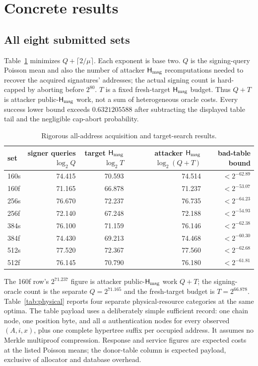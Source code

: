 \documentclass[11pt,a4paper]{article}
\newcommand{\Hmsg}{\ensuremath{\mathsf{H}_{\rm msg}}}
\begin{document}
\section{Concrete results}

\subsection{All eight submitted sets}

Table~\ref{tab:formal} minimizes $Q+\lceil2/\mu\rceil$.  Each exponent is base
two.  $Q$ is the signing-query Poisson mean and also the number of attacker
$\Hmsg$ recomputations needed to recover the acquired signatures' addresses;
the actual signing count is hard-capped by aborting before $2^{80}$.  $T$ is a
fixed fresh-target $\Hmsg$ budget.  Thus $Q+T$ is attacker public-$\Hmsg$ work,
not a sum of heterogeneous oracle costs.  Every success lower bound exceeds
$0.6321205588$ after subtracting the displayed table tail and the negligible
cap-abort probability.

\begin{table}[ht]
\centering
\small
\caption{Rigorous all-address acquisition and target-search results.}
\label{tab:formal}
\begin{tabular}{lrrrr}
\toprule
set & signer queries $\log_2 Q$ & target $\Hmsg$ $\log_2 T$ &
attacker $\Hmsg$ $\log_2(Q+T)$ & bad-table bound\\
\midrule
160s &74.415&70.593&74.514&$<2^{-62.89}$\\
160f &71.165&66.878&71.237&$<2^{-53.07}$\\
256s &76.670&72.237&76.735&$<2^{-64.23}$\\
256f &72.140&67.248&72.188&$<2^{-54.93}$\\
384s &76.100&71.159&76.146&$<2^{-62.38}$\\
384f &74.430&69.213&74.468&$<2^{-60.30}$\\
512s &77.520&72.367&77.560&$<2^{-62.68}$\\
512f &76.145&70.790&76.180&$<2^{-61.81}$\\
\bottomrule
\end{tabular}
\end{table}

The 160f row's $2^{71.237}$ figure is attacker public-$\Hmsg$ work $Q+T$;
the signing-oracle count is the separate $Q=2^{71.165}$ and the fresh-target
budget is $T=2^{66.878}$.  Table~\ref{tab:physical} reports four separate
physical-resource categories at the same optima.  The table payload
uses a deliberately simple sufficient record: one chain node, one position
byte, and all $a$ authentication nodes for every observed
$(A,i,x)$, plus one complete hypertree suffix per occupied address.  It assumes
no Merkle multiproof compression.  Response and service figures are expected
costs at the listed Poisson means; the donor-table column is expected payload,
exclusive of allocator and database overhead.
\end{document}
